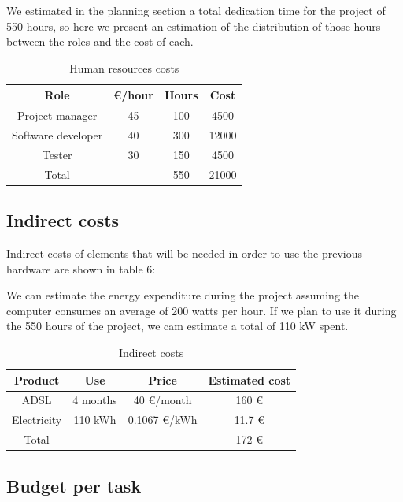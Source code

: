 We estimated in the planning section a total dedication time for the project of 550 hours, so here we present an estimation of the distribution of those hours between the roles and the cost of each.

\begin{table}[h!]
	\centering
	\def\arraystretch{1.2}
	\begin{tabular}{|c c c c |} 
		\hline
		Role & \euro/hour & Hours & Cost \\
		\hline\hline
		Project manager & 45 & 100 & 4500 \\
		\hline
		Software developer & 40 & 300 & 12000 \\
		\hline
		Tester & 30 & 150 & 4500 \\
		\hline\hline
		Total &  & 550 & 21000 \\
		\hline
	\end{tabular}
	\caption{Human resources costs}
\end{table}

\subsection{Indirect costs}

Indirect costs of elements that will be needed in order to use the previous hardware are shown in table 6:

We can estimate the energy expenditure during the project assuming the computer consumes an average of 200 watts per hour. If we plan to use it during the 550 hours of the project, we cam estimate a total of 110 kW spent.

\begin{table}[h!]
	\centering
	\def\arraystretch{1.2}
	\begin{tabular}{|c c c c|} 
		\hline
		Product & Use & Price & Estimated cost \\
		\hline\hline
		ADSL & 4 months & 40 \euro/month & 160 \euro\\
		\hline
		Electricity & 110 kWh & 0.1067 \euro/kWh & 11.7 \euro\\
		\hline\hline
		Total &  &  & 172 \euro\\
		\hline
	\end{tabular}
	\caption{Indirect costs}
\end{table}

\subsection{Budget per task}

